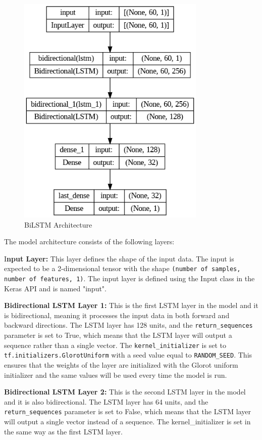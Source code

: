 \documentclass[a4paper]{article}
\begin{document}
\begin{figure}[!h]
    \centering
    \includegraphics[width=9cm]{architecture.png}
    \caption{BiLSTM Architecture}
    \label{fig:architecture}
\end{figure}

The model architecture consists of the following layers:

I\textbf{nput Layer:} This layer defines the shape of the input data. The input is expected to be a 2-dimensional tensor with the shape \texttt{(number of samples, number of features, 1)}. The input layer is defined using the Input class in the Keras API and is named "input".

\textbf{Bidirectional LSTM Layer 1:} This is the first LSTM layer in the model and it is bidirectional, meaning it processes the input data in both forward and backward directions. The LSTM layer has 128 units, and the \texttt{return\_sequences} parameter is set to True, which means that the LSTM layer will output a sequence rather than a single vector. The \texttt{kernel\_initializer} is set to \texttt{tf.initializers.GlorotUniform} with a seed value equal to \texttt{RANDOM\_SEED}. This ensures that the weights of the layer are initialized with the Glorot uniform initializer and the same values will be used every time the model is run.

\textbf{Bidirectional LSTM Layer 2:} This is the second LSTM layer in the model and it is also bidirectional. The LSTM layer has 64 units, and the \texttt{return\_sequences} parameter is set to False, which means that the LSTM layer will output a single vector instead of a sequence. The kernel\_initializer is set in the same way as the first LSTM layer.
\end{document}
